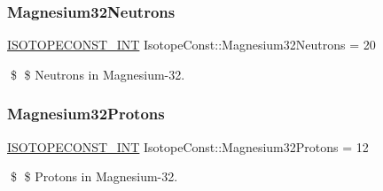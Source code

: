 \subsubsection{\texorpdfstring{Magnesium32\+Neutrons}{Magnesium32Neutrons}}
{\footnotesize\ttfamily \mbox{\hyperlink{group___isotope_const-_macros_ga5f18360b3e99483a35c32d789e62621c}{I\+S\+O\+T\+O\+P\+E\+C\+O\+N\+S\+T\+\_\+\+I\+NT}} Isotope\+Const\+::\+Magnesium32\+Neutrons = 20}

\$ \$ Neutrons in Magnesium-\/32. \mbox{\label{group___isotope_const-_magnesium-_mg32_ga40b718dab67db8f97bd8f7e65a3e2fb6}} 
\subsubsection{\texorpdfstring{Magnesium32\+Protons}{Magnesium32Protons}}
{\footnotesize\ttfamily \mbox{\hyperlink{group___isotope_const-_macros_ga5f18360b3e99483a35c32d789e62621c}{I\+S\+O\+T\+O\+P\+E\+C\+O\+N\+S\+T\+\_\+\+I\+NT}} Isotope\+Const\+::\+Magnesium32\+Protons = 12}

\$ \$ Protons in Magnesium-\/32. 
